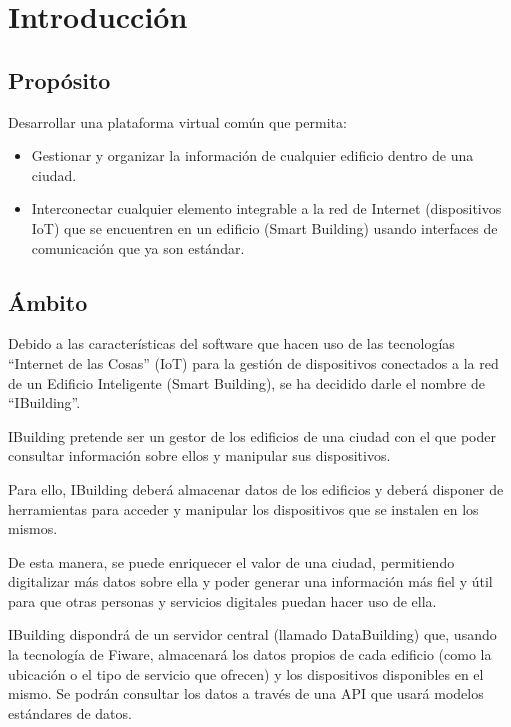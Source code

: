 \documentclass[12pt, a4paper, twoside]{article}
\begin{document}

\newpage
\tableofcontents

\section{Introducción}
\subsection{Propósito}
Desarrollar una plataforma virtual común que permita:
\begin{itemize}
  \item Gestionar y organizar la información de cualquier edificio 
        dentro de una ciudad.
  \item Interconectar cualquier elemento integrable a la red de Internet 
        (dispositivos IoT) que se encuentren en un edificio (Smart Building)
        usando interfaces de comunicación que ya son estándar.
\end{itemize}

\subsection{Ámbito}
Debido a las características del software que hacen uso de las tecnologías 
``Internet de las Cosas'' (IoT) para la gestión de dispositivos conectados a
la red de un Edificio Inteligente (Smart Building), se ha decidido darle el nombre de
``IBuilding''.

IBuilding pretende ser un gestor de los edificios de una ciudad con el que
poder consultar información sobre ellos y manipular sus dispositivos.
 
Para ello, IBuilding deberá almacenar datos de los edificios y 
deberá disponer de herramientas para acceder y manipular los dispositivos que se instalen
en los mismos.

De esta manera, se puede enriquecer el valor de una ciudad, permitiendo digitalizar más
datos sobre ella y poder generar una información más fiel y útil para que otras personas
y servicios digitales puedan hacer uso de ella.

IBuilding dispondrá de un servidor central (llamado DataBuilding) que, usando la tecnología
de Fiware, almacenará los datos propios de cada edificio (como la ubicación o el 
tipo de servicio que ofrecen) y los dispositivos disponibles en el mismo. 
Se podrán consultar los datos a través de una API que usará modelos estándares 
de datos.
\end{document}
